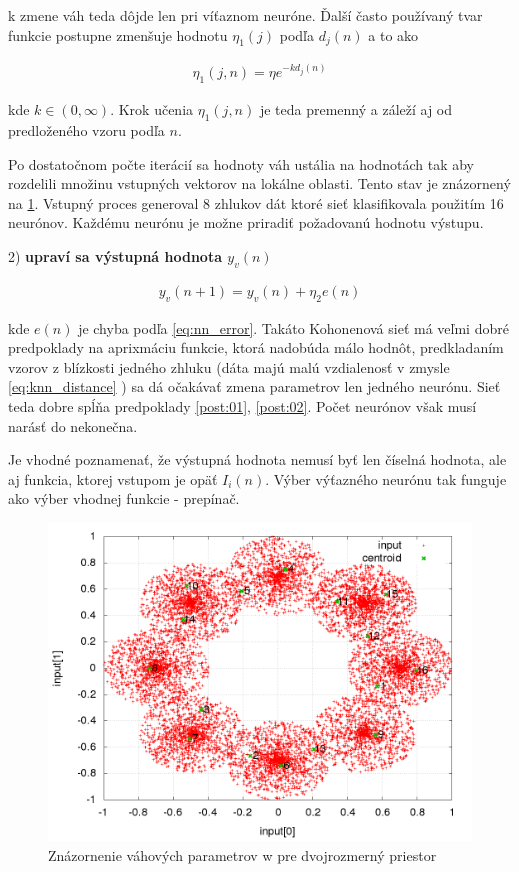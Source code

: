 k zmene váh teda dôjde len pri víťaznom neuróne.
Ďalší často používaný tvar funkcie postupne zmenšuje hodnotu $\eta_1(j)$ podľa
$d_j(n)$ a to ako

\begin{align}
\eta_1(j, n) = \eta e^{-kd_j(n)}
\label{eq:knn_func_simple2}
\end{align}

kde $k \in (0, \infty )$. Krok učenia $\eta_1(j, n)$ je teda premenný a záleží
aj od predloženého vzoru podľa $n$.

Po dostatočnom počte iterácií sa hodnoty váh ustália na hodnotách tak aby rozdelili
množinu vstupných vektorov na lokálne oblasti. Tento stav je znázornený na \ref{img:knn_learning_result}.
Vstupný proces generoval 8 zhlukov dát ktoré sieť klasifikovala použitím 16 neurónov.
Každému neurónu je možne priradiť požadovanú hodnotu výstupu.

{2) \bf upraví sa výstupná hodnota $y_v(n)$}

\begin{align}
y_v(n+1) = y_v(n) + \eta_2 e(n)
\label{eq:knn_y_update}
\end{align}

kde $e(n)$ je chyba podľa \ref{eq:nn_error}.
Takáto Kohonenová sieť má veľmi dobré predpoklady na aprixmáciu funkcie,
ktorá nadobúda málo hodnôt, predkladaním vzorov z blízkosti
jedného zhluku (dáta majú malú vzdialenosť v zmysle \ref{eq:knn_distance} )
sa dá očakávať zmena parametrov len jedného neurónu. Sieť teda dobre spĺňa predpoklady
\ref{post:01},  \ref{post:02}. Počet neurónov však musí narásť do nekonečna.

Je vhodné poznamenať, že výstupná hodnota nemusí byť len číselná hodnota, ale aj funkcia, ktorej vstupom je opäť
$I_i(n)$. Výber výťazného neurónu tak funguje ako výber vhodnej funkcie - prepínač.

\begin{figure}[]
\center
\includegraphics[scale=.4]{../pictures/knn_learing_result.png}
\caption{Znázornenie váhových parametrov w pre dvojrozmerný priestor}
\label{img:knn_learning_result}
\end{figure}

